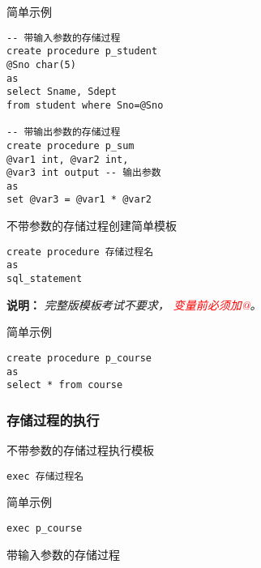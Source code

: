 \qquad 简单示例

\begin{mdframed}[backgroundcolor=gray!10]
\begin{verbatim}
-- 带输入参数的存储过程
create procedure p_student
@Sno char(5)
as
select Sname, Sdept
from student where Sno=@Sno

-- 带输出参数的存储过程
create procedure p_sum
@var1 int, @var2 int,
@var3 int output -- 输出参数
as
set @var3 = @var1 * @var2
\end{verbatim}
\end{mdframed}

\qquad 不带参数的存储过程创建简单模板

\begin{mdframed}[backgroundcolor=gray!10]
\begin{verbatim}
create procedure 存储过程名
as
sql_statement
\end{verbatim}
\end{mdframed}

\qquad \textbf{说明：} \emph{完整版模板考试不要求，
\textcolor{Red}{变量前必须加@}。}

\qquad 简单示例

\begin{mdframed}[backgroundcolor=gray!10]
\begin{verbatim}
create procedure p_course
as
select * from course
\end{verbatim}
\end{mdframed}

\subsubsection{存储过程的执行}

\qquad 不带参数的存储过程执行模板

\begin{mdframed}[backgroundcolor=gray!10]
\begin{verbatim}
exec 存储过程名
\end{verbatim}
\end{mdframed}

\qquad 简单示例

\begin{mdframed}[backgroundcolor=gray!10]
\begin{verbatim}
exec p_course
\end{verbatim}
\end{mdframed}

\qquad 带输入参数的存储过程

